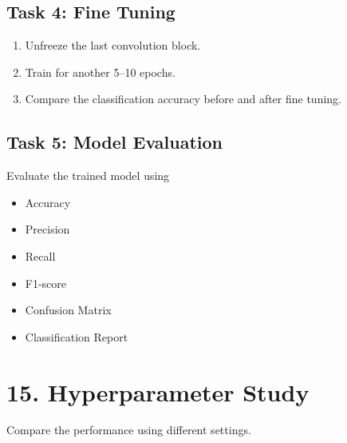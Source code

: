 \documentclass[11pt]{article}
\begin{document}

\subsection*{Task 4: Fine Tuning}

\begin{enumerate}

\item Unfreeze the last convolution block.

\item Train for another 5--10 epochs.

\item Compare the classification accuracy before and after fine tuning.

\end{enumerate}


\subsection*{Task 5: Model Evaluation}

Evaluate the trained model using

\begin{itemize}

\item Accuracy

\item Precision

\item Recall

\item F1-score

\item Confusion Matrix

\item Classification Report

\end{itemize}


\section*{15. Hyperparameter Study}

Compare the performance using different settings.
\end{document}
